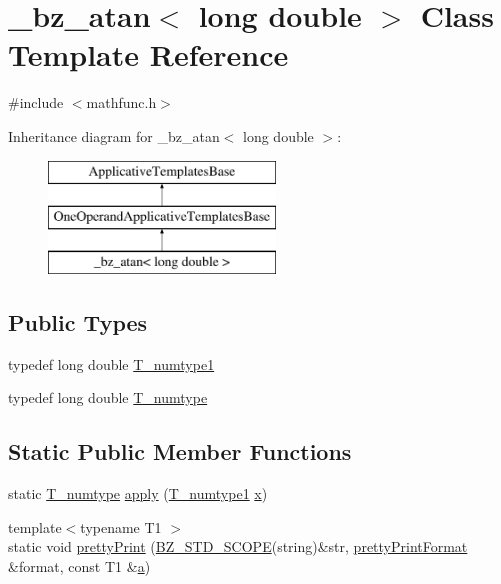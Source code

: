 \hypertarget{class__bz__atan_3_01long_01double_01_4}{}\section{\+\_\+bz\+\_\+atan$<$ long double $>$ Class Template Reference}
\label{class__bz__atan_3_01long_01double_01_4}


{\ttfamily \#include $<$mathfunc.\+h$>$}

Inheritance diagram for \+\_\+bz\+\_\+atan$<$ long double $>$\+:\begin{figure}[H]
\begin{center}
\leavevmode
\includegraphics[height=3.000000cm]{class__bz__atan_3_01long_01double_01_4}
\end{center}
\end{figure}
\subsection*{Public Types}
\begin{DoxyCompactItemize}
\item 
typedef long double \hyperlink{class__bz__atan_3_01long_01double_01_4_a34273cb803b75ca34da86b2990297e38}{T\+\_\+numtype1}
\item 
typedef long double \hyperlink{class__bz__atan_3_01long_01double_01_4_a0687305de7c55c4b197b8be9d0684a63}{T\+\_\+numtype}
\end{DoxyCompactItemize}
\subsection*{Static Public Member Functions}
\begin{DoxyCompactItemize}
\item 
static \hyperlink{class__bz__atan_3_01long_01double_01_4_a0687305de7c55c4b197b8be9d0684a63}{T\+\_\+numtype} \hyperlink{class__bz__atan_3_01long_01double_01_4_af4f08db0470905c904c60089dfe59c2c}{apply} (\hyperlink{class__bz__atan_3_01long_01double_01_4_a34273cb803b75ca34da86b2990297e38}{T\+\_\+numtype1} \hyperlink{vecnorm1_8cc_ac73eed9e41ec09d58f112f06c2d6cb63}{x})
\item 
{\footnotesize template$<$typename T1 $>$ }\\static void \hyperlink{class__bz__atan_3_01long_01double_01_4_a7e2d4ab6981545f173c2adbfed1ca59e}{pretty\+Print} (\hyperlink{numinquire_8h_a2b24ffc3b4ef9803956bc7715c6c7b83}{B\+Z\+\_\+\+S\+T\+D\+\_\+\+S\+C\+O\+P\+E}(string)\&str, \hyperlink{classprettyPrintFormat}{pretty\+Print\+Format} \&format, const T1 \&\hyperlink{gen__mat5files_8m_aae328bf20413f220e38aec4d95bfd6da}{a})
\end{DoxyCompactItemize}


